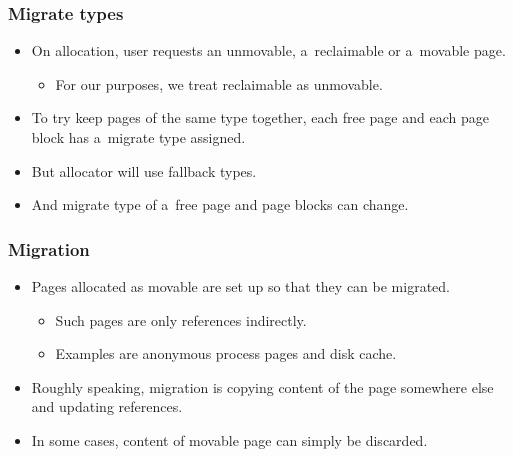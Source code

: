 \begin{frame}[fragile]
  \frametitle{Migrate types}

  \begin{itemize}
  \item On allocation, user requests an unmovable, a~reclaimable or
    a~movable page.
    \begin{itemize}
    \item For our purposes, we treat reclaimable as unmovable.
    \end{itemize}
  \item To try keep pages of the same type together, each free page
    and each page block has a~migrate type assigned.
  \item But allocator will use fallback types.
  \item And migrate type of a~free page and page blocks can change.
  \end{itemize}
\end{frame}

\begin{frame}
  \frametitle{Migration}

  \begin{itemize}
  \item Pages allocated as movable are set up so that they can be
    migrated.
    \begin{itemize}
    \item Such pages are only references indirectly.
    \item Examples are anonymous process pages and disk cache.
    \end{itemize}
  \item Roughly speaking, migration is copying content of the page
    somewhere else and updating references.
  \item In some cases, content of movable page can simply be
    discarded.
  \end{itemize}

\end{frame}
